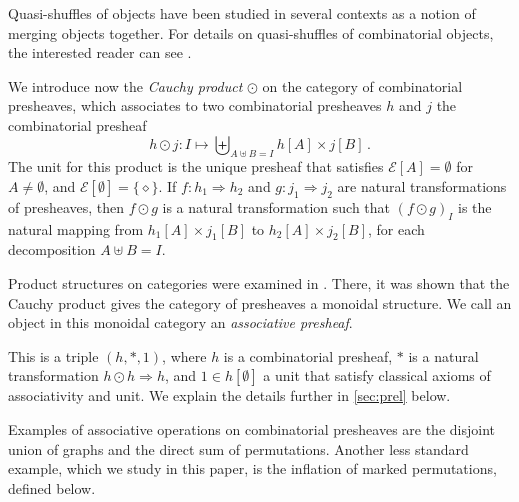 \documentclass[12pt, reqno]{amsart}
\theoremstyle{definition}
\begin{document}
Quasi-shuffles of objects have been studied in several contexts as a notion of merging objects together.
For details on quasi-shuffles of combinatorial objects, the interested reader can see \cite{hoffman00,aguiar10,foissy16}.


\bigskip


We introduce now the \textit{Cauchy product} $\odot $ on the category of combinatorial presheaves, which associates to two combinatorial presheaves $h$ and $ j$ the combinatorial presheaf 
$$h \odot j : I \mapsto \biguplus_{A\uplus B = I} h[A] \times j[B] \, . $$
The unit for this product is the unique presheaf that satisfies $\mathcal{E}[A] = \emptyset$ for $A \neq \emptyset$, and $\mathcal{E}[\emptyset] = \{ \diamond \} $.
If $f:h_1 \Rightarrow h_2$ and $ g: j_1 \Rightarrow j_2 $ are natural transformations of presheaves, then $f\odot g$ is a natural transformation such that $(f\odot g)_I$ is the natural mapping from $h_1[A]\times j_1[B]$ to $h_2[A] \times j_2[B]$, for each decomposition $A\uplus B = I$.

Product structures on categories were examined in \cite{maclane63}.
There, it was shown that the Cauchy product gives the category of presheaves a monoidal structure. We call an object in this monoidal category an \emph{associative presheaf}.

This is a triple $(h, \ast, 1)$, where $h$ is a combinatorial presheaf, $\ast $ is a natural transformation $h\odot h \Rightarrow h$, and $1 \in h[\emptyset ] $ a unit that satisfy classical axioms of associativity and unit. 
We explain the details further in \cref{sec:prel} below.

Examples of associative operations on combinatorial presheaves are the disjoint union of graphs and the direct sum of permutations.
Another less standard example, which we study in this paper, is the inflation of marked permutations, defined below.
\end{document}
